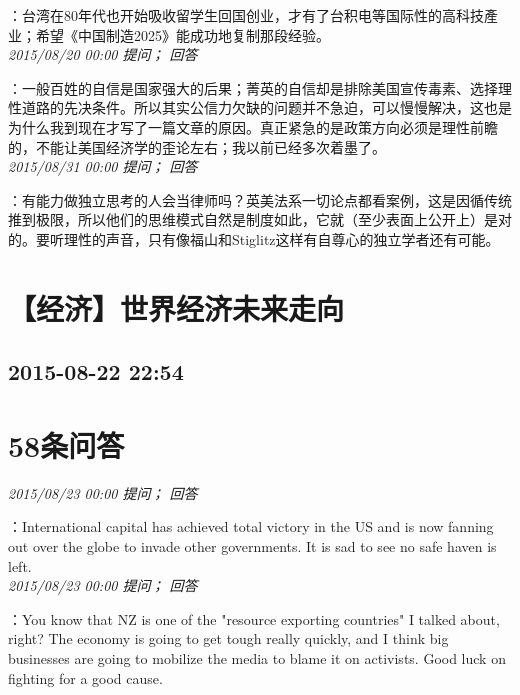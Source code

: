 \documentclass[twocolumn]{ctexart}
\begin{document}
：台湾在80年代也开始吸收留学生回国创业，才有了台积电等国际性的高科技產业；希望《中国制造2025》能成功地复制那段经验。\\

\textit{\hfill\noindent\small 2015/08/20 00:00 提问； 回答}

：一般百姓的自信是国家强大的后果；菁英的自信却是排除美国宣传毒素、选择理性道路的先决条件。所以其实公信力欠缺的问题并不急迫，可以慢慢解决，这也是为什么我到现在才写了一篇文章的原因。真正紧急的是政策方向必须是理性前瞻的，不能让美国经济学的歪论左右；我以前已经多次着墨了。\\

\textit{\hfill\noindent\small 2015/08/31 00:00 提问； 回答}

：有能力做独立思考的人会当律师吗？英美法系一切论点都看案例，这是因循传统推到极限，所以他们的思维模式自然是制度如此，它就（至少表面上公开上）是对的。要听理性的声音，只有像福山和Stiglitz这样有自尊心的独立学者还有可能。\\


\section{【经济】世界经济未来走向}
\subsection{2015-08-22 22:54}


\section{58条问答}

\textit{\hfill\noindent\small 2015/08/23 00:00 提问； 回答}

：International capital has achieved total victory in the US and is now fanning out over the globe to invade other governments. It is sad to see no safe haven is left.\\

\textit{\hfill\noindent\small 2015/08/23 00:00 提问； 回答}

：You know that  NZ is one of the "resource exporting countries" I talked about, right? The economy is going to get tough really quickly, and I think big businesses are going to mobilize the media to blame it on activists. Good luck on fighting for a good cause.\\
\end{document}
